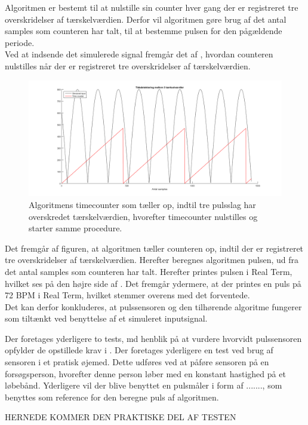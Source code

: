 Algoritmen er bestemt til at nulstille sin counter hver gang der er registreret tre overskridelser af tærskelværdien. Derfor vil algoritmen gøre brug af det antal samples som counteren har talt, til at bestemme pulsen for den pågældende periode. \\
Ved at indsende det simulerede signal fremgår det af , hvordan counteren nulstilles når der er registreret tre overskridelser af tærskelværdien. 

\begin{figure}[H]
	\centering
	\includegraphics[scale=0.5]{figures/cDesign/timecounter_puls_pic.png}
	\caption{Algoritmens timecounter som tæller op, indtil tre pulsslag har overskredet tærskelværdien, hvorefter timecounter nulstilles og starter samme procedure.}
\label{fig:timecounter_puls_realterm}
\end{figure}

Det fremgår af figuren, at algoritmen tæller counteren op, indtil der er registreret tre overskridelser af tærskelværdien. Herefter beregnes algoritmen pulsen, ud fra det antal samples som counteren har talt. Herefter printes pulsen i Real Term, hvilket ses på den højre side af . Det fremgår ydermere, at der printes en puls på 72 BPM i Real Term, hvilket stemmer overens med det forventede. \\
Det kan derfor konkluderes, at pulssensoren og den tilhørende algoritme fungerer som tiltænkt ved benyttelse af et simuleret inputsignal. 

Der foretages yderligere to tests, md henblik på at vurdere hvorvidt pulssensoren opfylder de opstillede krav i .
Der foretages yderligere en test ved brug af sensoren i et pratisk øjemed. Dette udføres ved at påføre sensoren på en forsøgsperson, hvorefter denne person løber med en konstant hastighed på et løbebånd. Yderligere vil der blive benyttet en pulsmåler i form af ......., som benyttes som reference for den beregne puls af algoritmen. 

HERNEDE KOMMER DEN PRAKTISKE DEL AF TESTEN







